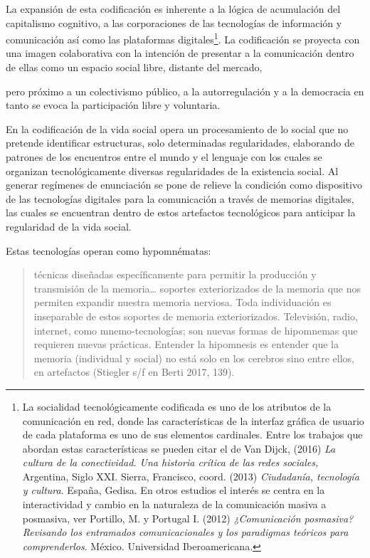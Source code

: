 \documentclass[
]{interact}
\begin{document}
La expansión de esta codificación es inherente a la lógica de
acumulación del capitalismo cognitivo, a las corporaciones de las
tecnologías de información y comunicación así como las plataformas
digitales\footnote{La socialidad tecnológicamente codificada es uno de
  los atributos de la comunicación en red, donde las características de
  la interfaz gráfica de usuario de cada plataforma es uno de sus
  elementos cardinales. Entre los trabajos que abordan estas
  características se pueden citar el de Van Dijck, (2016) \emph{La
  cultura de la conectividad. Una historia crítica de las redes
  sociales,} Argentina, Siglo XXI. Sierra, Francisco, coord. (2013)
  \emph{Ciudadanía, tecnología y cultura}. España, Gedisa. En otros
  estudios el interés se centra en la interactividad y cambio en la
  naturaleza de la comunicación masiva a posmasiva, ver Portillo, M. y
  Portugal I. (2012) \emph{¿Comunicación posmasiva? Revisando los
  entramados comunicacionales y los paradigmas teóricos para
  comprenderlos}. México. Universidad Iberoamericana.}. La codificación
se proyecta con una imagen colaborativa con la intención de presentar a
la comunicación dentro de ellas como un espacio social libre, distante
del mercado,

pero próximo a un colectivismo público, a la autorregulación y a la
democracia en tanto se evoca la participación libre y voluntaria.

En la codificación de la vida social opera un procesamiento de lo social
que no pretende identificar estructuras, solo determinadas
regularidades, elaborando de patrones de los encuentros entre el mundo y
el lenguaje con los cuales se organizan tecnológicamente diversas
regularidades de la existencia social. Al generar regímenes de
enunciación se pone de relieve la condición como dispositivo de las
tecnologías digitales para la comunicación a través de memorias
digitales, las cuales se encuentran dentro de estos artefactos
tecnológicos para anticipar la regularidad de la vida social.

Estas tecnologías operan como hypomnématas:

\begin{quote}
técnicas diseñadas específicamente para permitir la producción y
transmisión de la memoria\ldots{} soportes exteriorizados de la memoria
que nos permiten expandir nuestra memoria nerviosa. Toda individuación
es inseparable de estos soportes de memoria exteriorizados. Televisión,
radio, internet, como mnemo-tecnologías; son nuevas formas de hipomnemas
que requieren nuevas prácticas. Entender la hipomnesis es entender que
la memoria (individual y social) no está solo en los cerebros sino entre
ellos, en artefactos (Stiegler s/f en Berti 2017, 139).
\end{quote}
\end{document}
